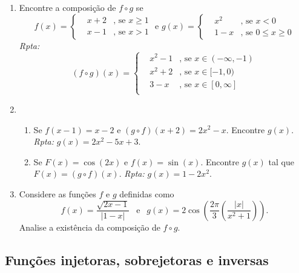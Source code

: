 \documentclass[latin,20pt]{article}
\begin{document}
\begin{enumerate}
$$\begin{array}{lll}
            & \frac{\sqrt{x}}{x+5}     &\text{, se } x \in [4,\infty] \\
            \end{array}
            \right. 
    $$
    \item Encontre a composição de $f\circ g$
     se 
    $$
    f(x)= \left\{  
            \begin{array}{lll}
            &x+2  &\text{, se } x\geq 1\\
            &x-1 &\text{, se } x> 1
            \end{array}
            \right.
     \text{ e }
    g(x)= \left\{  
            \begin{array}{lll}
            &x^2  &\text{, se } x<0\\
            &1-x   &\text{, se } 0\leq x \geq 0 
            \end{array}
            \right. 
    $$
    {\it Rpta:} 
     $$
    (f\circ g)(x)= \left\{  
            \begin{array}{lll}
    &x^2-1 &\text{, se } x \in (-\infty, -1) \\
    &x^2+2 &\text{, se } x \in [-1,0) \\
    & 3-x  &\text{, se } x \in [0,\infty] \\
            \end{array}
            \right. 
    $$
    \item 
       \begin{enumerate}
       \item Se $f(x-1)=x-2$ e $(g\circ f)(x+2)=2x^2-x$. Encontre $g(x)$. 
    {\it Rpta: } $g(x)=2x^2-5x+3$.
       \item Se $F(x)=\cos(2x)$ e $f(x)=\sin(x)$.  Encontre $g(x)$ tal que 
       $F(x)=(g \circ f)(x)$. {\it Rpta: } $g(x)=1-2x^2$.  
      \end{enumerate}
    \item Considere as funções $f$ e $g$ definidas como  
    $$f(x)=\frac{\sqrt{2x-1}}{|1-x|} \ \ \text{ e } \ \ g(x)=2\cos(\frac{2\pi}{3}(\frac{|x|}{x^2+1})).$$ Analise a existência da composição de $f \circ g$.  
    \end{enumerate}
 \subsection{Funções injetoras, sobrejetoras e inversas} 
 
\end{document}
